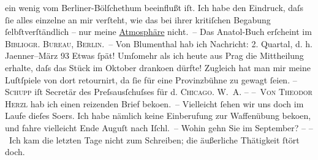 \begin{ledgroupsized}[t]{13cm}
               ein wenig vom Berliner-Bölſchethum beeinflußt iſt. Ich habe den Eindruck, daſs ſie
               alles einzelne an mir verſteht, wie das bei ihrer kritiſchen {\pb}Begabung ſelbſtverſtändlich – nur meine \uline{Atmosphäre} nicht. –\pend
           \pstart
           Das Anatol-Buch erſcheint im \textsc{Bibliogr. Bureau, Berlin}. –\pend
           \pstart
           Von Blumenthal hab ich Nachricht: 2. Quartal,
               d. h. Jaenner–März 93 Etwas ſpät! Umſomehr als ich heute
               aus Prag die Mittheilung erhalte, daſs das Stück im Oktober dranko{\geminationm}en dürfte! Zugleich hat man mir meine Luſtſpiele von
               dort retournirt, da ſie für eine Provinzbühne zu gewagt ſeien.\pend
           \pstart
           {\pb}– \textsc{Schupp} iſt Secretär des Preſsausſchuſses für d. \textsc{Chicago. W. A.} –\pend
           \pstart
           – \textsc{Von Theodor Herzl} hab ich einen reizenden Brief beko{\geminationm}en. –\pend
           \pstart
           Vielleicht ſehen wir uns doch im Laufe dieſes So{\geminationm}ers.
               Ich habe nämlich keine Einberufung zur Waffenübung beko{\geminationm}en, und fahre vielleicht Ende Auguſt nach Iſchl. – Wohin gehn Sie im September? –\pend
           \pstart
           – Ich kam die letzten Tage nicht zum Schreiben; die äußerliche Thätigkeit ſtört doch.

\end{ledgroupsized}
